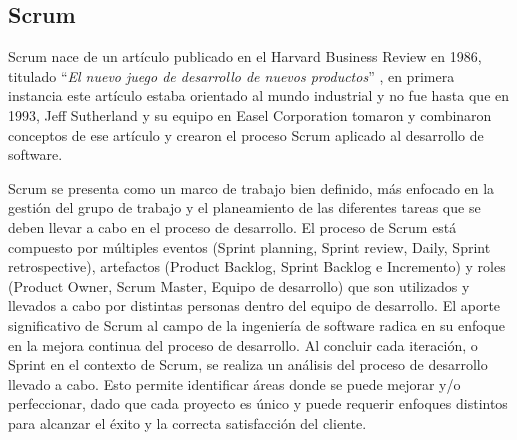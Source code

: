\documentclass[a4paper,10pt]{article}
\begin{document}
	\subsection{Scrum}
	Scrum nace de un artículo publicado en el Harvard Business Review en 1986, titulado “\textit{El nuevo juego de desarrollo de nuevos productos}” \parencite{Takeuchi_Nonaka_1986}, en primera instancia este artículo estaba orientado al mundo industrial y no fue hasta que en 1993, Jeff Sutherland y su equipo en Easel Corporation tomaron y combinaron conceptos de ese artículo y crearon el proceso Scrum aplicado al desarrollo de software.
	
	Scrum se presenta como un marco de trabajo bien definido, más enfocado en la gestión del grupo de trabajo y el planeamiento de las diferentes tareas que se deben llevar a cabo en el proceso de desarrollo. El proceso de Scrum está compuesto por múltiples eventos (Sprint planning, Sprint review, Daily, Sprint retrospective), artefactos (Product Backlog, Sprint Backlog e Incremento) y roles (Product Owner, Scrum Master, Equipo de desarrollo) que son utilizados y llevados a cabo por distintas personas dentro del equipo de desarrollo. El aporte significativo de Scrum al campo de la ingeniería de software radica en su enfoque en la mejora continua del proceso de desarrollo. Al concluir cada iteración, o Sprint en el contexto de Scrum, se realiza un análisis del proceso de desarrollo llevado a cabo. Esto permite identificar áreas donde se puede mejorar y/o perfeccionar, dado que cada proyecto es único y puede requerir enfoques distintos para alcanzar el éxito y la correcta satisfacción del cliente.
	
\end{document}
